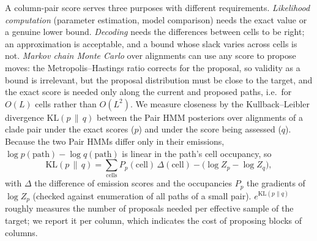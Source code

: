 \documentclass[11pt]{article}
\begin{document}
A column-pair score serves three purposes with different requirements.
\emph{Likelihood computation} (parameter estimation, model comparison) needs the
exact value or a genuine lower bound. \emph{Decoding} needs the differences
between cells to be right; an approximation is acceptable, and a bound whose
slack varies across cells is not. \emph{Markov chain Monte Carlo} over
alignments can use any score to propose moves: the Metropolis--Hastings ratio
corrects for the proposal, so validity as a bound is irrelevant, but the
proposal distribution must be close to the target, and the exact score is needed
only along the current and proposed paths, i.e.\ for $O(L)$ cells rather than
$O(L^2)$. We measure closeness by the Kullback--Leibler divergence
$\mathrm{KL}(p\,\|\,q)$ between the Pair HMM posteriors over alignments of a
clade pair under the exact scores ($p$) and under the score being assessed
($q$). Because the two Pair HMMs differ only in their emissions,
$\log p(\text{path})-\log q(\text{path})$ is linear in the path's cell
occupancy, so
\[
\mathrm{KL}(p\,\|\,q)=\sum_{\text{cells}}P_p(\text{cell})\,\Delta(\text{cell})
-\big(\log Z_p-\log Z_q\big),
\]
with $\Delta$ the difference of emission scores and the occupancies
$P_p$ the gradients of $\log Z_p$ (checked against enumeration of all paths of
a small pair). $e^{\mathrm{KL}(p\|q)}$ roughly measures the number of proposals
needed per effective sample of the target; we report it per column, which
indicates the cost of proposing blocks of columns.
\end{document}
